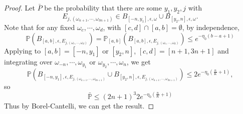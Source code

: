 \begin{proof}
Let $\bar{P}$
be the probability that there are some $y_1, y_2, j$ with \[
E_{j,(\omega_{n+1},\cdots,\omega_{3n+1})}\in B_{[-n,y_1],\epsilon,\omega}\cup B_{[y_2,n],\epsilon,\omega}.
\] Note that for any fixed $\omega_c,\cdots,\omega_d $, with $[c,d]\cap[a,b]=\emptyset$, by independence,
\[
\mathbb{P}(B_{[a,b],\epsilon,E_{j,(\omega_c,\cdots,\omega_d)}})=\mathbb{P}_{[a,b]}(B_{[a,b],\epsilon,E_{j,(\omega_c,\cdots,\omega_d)}})\leq e^{-\eta_0(b-a+1)}
\]
Applying to $[a,b]=[-n,y_1]$ or $[y_2,n]$, $[c,d]=[n+1,3n+1]$ and integrating over $\omega_{-n},\cdots,\omega_{y_1}$ or $\omega_{y_2},\cdots,\omega_{n}$, we get
\[
\mathbb{P}(B_{[-n,y_1],\epsilon,E_{j,(\omega_{n+1},\cdots,\omega_{3n+1})}}\cup B_{[y_2,n],\epsilon,E_{j,(\omega_{n+1},\cdots,\omega_{3n+1})}}) \leq 2e^{-\eta_0(\frac{n}{K}+1)},
\]
so
\[
\bar{\mathbb{P}}\leq(2n+1)^3 2e^{-\eta_0(\frac{n}{K}+1)}
\]
Thus by Borel-Cantelli, we can get the result.

\end{proof}

